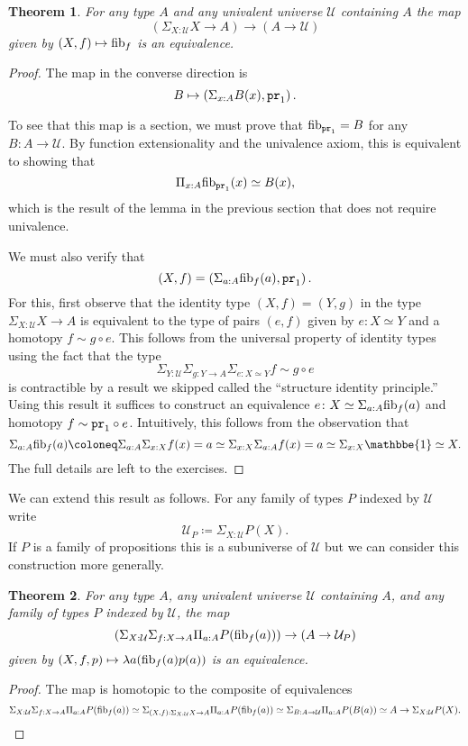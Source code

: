 \documentclass{amsart}
\theoremstyle{theorem}
\newtheorem*{thm}{Theorem}
\theoremstyle{definition}
\theoremstyle{remark}
\newcommand{\0}{\mathbbe{0}}
\newcommand{\1}{\mathbbe{1}}
\newcommand{\2}{\mathbbe{2}}
\newcommand{\3}{\mathbbe{3}}
\newcommand{\4}{\mathbbe{4}}
\newcommand{\term}[1]{{\textup{\texttt{#1}}}}
\newcommand{\type}[1]{{\textup{#1}}}
\newcommand{\pr}{\term{pr}}
\newcommand{\UU}{{\mathcal{U}}}
\newcommand{\fib}{\type{fib}}
\begin{document}
\begin{thm} For any type $A$ and any univalent universe $\UU$ containing $A$ the map
\[ \left( \Sigma_{X:\UU} X \to A \right) \to (A \to \UU)\]
given by $(X,f) \mapsto \fib_f$ is an equivalence.
\end{thm}
\begin{proof}
The map in the converse direction is 
\[ B \mapsto \left( \Sigma_{x:A}B(x),\pr_1\right).\]

To see that this map is a section, we must prove that $\fib_{\pr_1} = B$ for any $B \colon A \to \UU$. By function extensionality and the univalence axiom, this is equivalent to showing that
\[ \Pi_{x:A} \fib_{\pr_1}(x) \simeq B(x), \] which is the result of the lemma in the previous section that does not require univalence.

We must also verify that \[(X,f) = \left( \Sigma_{a:A} \fib_f(a), \pr_1\right).\]
For this, first observe that the identity type $(X,f) = (Y,g)$ in the type $\Sigma_{X: \UU} X \to A$ is equivalent to the type of pairs $(e,f)$ given by $e : X \simeq Y$ and a homotopy $f \sim g \circ e$. This follows from the universal property of identity types using the fact that the type
\[ \Sigma_{Y : \UU} \Sigma_{g \colon Y \to A} \Sigma_{e : X \simeq Y} f \sim g \circ e\]
is contractible by a result we skipped called the ``structure identity principle.'' Using this result it suffices to construct an equivalence $e \colon X \simeq \Sigma_{a:A} \fib_f(a)$ and homotopy $f \sim \pr_1 \circ e$. Intuitively, this follows from the observation that
\[ \Sigma_{a:A} \fib_f(a) \coloneq \Sigma_{a:A} \Sigma_{x:X} f(x) =a \simeq \Sigma_{x:X}\Sigma_{a:A} f(x) =a \simeq \Sigma_{x:X} \1 \simeq X.\]
The full details are left to the exercises.
\end{proof}

We can extend this result as follows. For any family of types $P$ indexed by $\UU$ write 
\[ \UU_P \coloneq \Sigma_{X:\UU} P(X).\] If $P$ is a family of propositions this is a subuniverse of $\UU$ but we can consider this construction more generally. 


\begin{thm} 
For any type $A$, any univalent universe $\UU$ containing $A$, and any family of types $P$ indexed by $\UU$, the map
\[ \left( \Sigma_{X:\UU} \Sigma_{f : X \to A} \Pi_{a:A} P(\fib_f(a)) \right) \to (A \to \UU_P)\]
given by $(X,f,p) \mapsto \lambda a (\fib_f(a)p(a))$ is an equivalence.
\end{thm}
\begin{proof}
The map is homotopic to the composite of equivalences
\[ \Sigma_{X:\UU} \Sigma_{f : X \to A} \Pi_{a:A} P(\fib_f(a)) \simeq \Sigma_{(X,f) : \Sigma_{X:\UU}X \to A} \Pi_{a:A} P(\fib_f(a)) \simeq \Sigma_{B: A \to \UU} \Pi_{a:A}P(B(a)) \simeq A \to \Sigma_{X:\UU} P(X). \qedhere\]
\end{proof}
\end{document}
